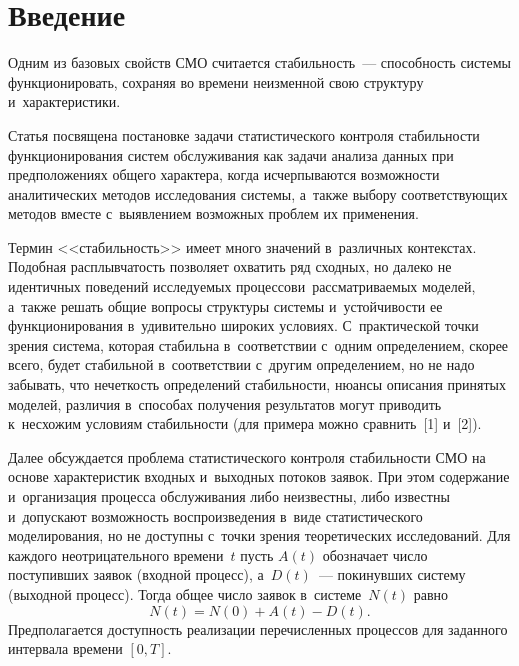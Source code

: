       
      
  



\thispagestyle{headings}

\begin{multicols}{2}

\label{st\stat}

\section{Введение}

     Одним из базовых свойств СМО 
считается ста\-биль\-ность~--- спо\-соб\-ность сис\-те\-мы функционировать, сохраняя во 
времени неизменной свою структуру и~характеристики. 
     
     Статья посвящена постановке задачи статистического контроля 
ста\-биль\-ности функционирования сис\-тем обслуживания как задачи анализа данных 
при предположениях общего характера, когда исчерпываются возможности 
аналитических методов исследования сис\-те\-мы, а~также выбору со\-от\-вет\-ст\-ву\-ющих 
методов вместе с~выявлением возможных проб\-лем их применения.
     
     Термин <<стабильность>> имеет много значений в~различных контекстах. 
Подобная расплывчатость позволяет охватить ряд сходных, но далеко не 
идентичных поведений исследуемых процессов\linebreak и~рассматриваемых моделей, 
а~также решать общие вопросы структуры системы и~устойчивости ее\linebreak 
функционирования в~удивительно широких усло\-ви\-ях. С~практической точки 
зрения сис\-те\-ма, \mbox{которая} стабильна в~соответствии с~одним определением, скорее 
всего, будет стабильной в~соответствии с~другим определением, но не надо 
забывать, что не\-чет\-кость определений ста\-биль\-ности, нюансы описания принятых 
моделей, различия в~способах получения результатов могут приводить к~несхожим 
условиям ста\-биль\-ности (для примера мож\-но сравнить~[1] и~[2]).
     
     Далее обсуждается проблема статистического контроля стабильности СМО 
на основе характеристик входных и~выходных потоков заявок. При этом 
содержание и~организация процесса обслуживания либо неизвестны, либо известны и~допускают воз\-мож\-ность воспроизведения в~виде статистического 
моделирования, но не доступны с~точки зрения теоретических исследований. Для 
каждого неотрицательного времени~$t$ пусть $A(t)$ обозначает чис\-ло 
поступивших заявок (входной процесс), а~$D(t)$~--- покинувших сис\-те\-му 
(выходной процесс). Тогда общее число заявок в~сис\-те\-ме~$N(t)$ рав\-но 
$$
N(t)=  N(0)+A(t)-D(t).
$$
 Предполагается доступность реализации перечисленных 
процессов для заданного интервала времени $[0,T]$. 
     

\end{multicols}
